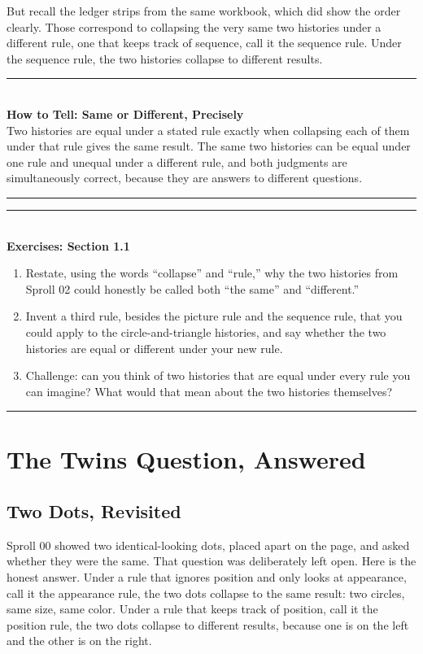 \documentclass[11pt]{book}
\newenvironment{algorithmproc}[1]{\vspace{0.6em}\noindent\rule{\linewidth}{0.6pt}\\[0.2em]\textbf{How to Tell: #1}\\[0.3em]}{\\[0.2em]\noindent\rule{\linewidth}{0.6pt}\vspace{0.6em}}
\newenvironment{exercisebox}[1]{\vspace{0.8em}\noindent\rule{\linewidth}{0.6pt}\\[0.2em]\textbf{Exercises: #1}\\[0.3em]\begin{enumerate}[label=\arabic*., itemsep=0.4em]}{\end{enumerate}\noindent\rule{\linewidth}{0.6pt}\vspace{0.6em}}
\begin{document}
But recall the ledger strips from the same workbook, which did show the order clearly. Those correspond to collapsing the very same two histories under a different rule, one that keeps track of sequence, call it the sequence rule. Under the sequence rule, the two histories collapse to different results.

\begin{algorithmproc}{Same or Different, Precisely}
Two histories are equal under a stated rule exactly when collapsing each of them under that rule gives the same result. The same two histories can be equal under one rule and unequal under a different rule, and both judgments are simultaneously correct, because they are answers to different questions.
\end{algorithmproc}

\begin{exercisebox}{Section 1.1}
\item Restate, using the words ``collapse'' and ``rule,'' why the two histories from Sproll 02 could honestly be called both ``the same'' and ``different.''
\item Invent a third rule, besides the picture rule and the sequence rule, that you could apply to the circle-and-triangle histories, and say whether the two histories are equal or different under your new rule.
\item Challenge: can you think of two histories that are equal under every rule you can imagine? What would that mean about the two histories themselves?
\end{exercisebox}

\chapter{The Twins Question, Answered}

\section{Two Dots, Revisited}

Sproll 00 showed two identical-looking dots, placed apart on the page, and asked whether they were the same. That question was deliberately left open. Here is the honest answer. Under a rule that ignores position and only looks at appearance, call it the appearance rule, the two dots collapse to the same result: two circles, same size, same color. Under a rule that keeps track of position, call it the position rule, the two dots collapse to different results, because one is on the left and the other is on the right.
\end{document}
